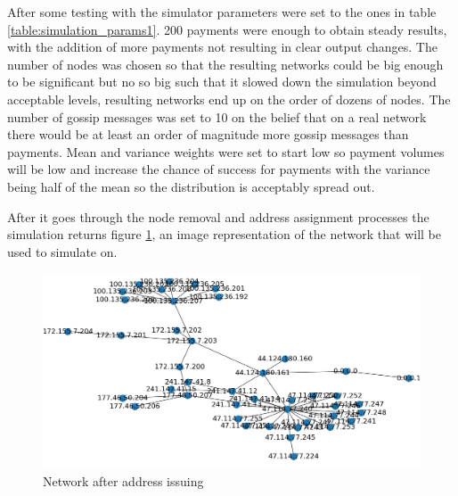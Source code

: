 After some testing with the simulator parameters were set to the ones in table \ref{table:simulation_params1}. 200 payments were enough to obtain steady results, with the addition of more payments not resulting in clear output changes. The number of nodes was chosen so that the resulting networks could be big enough to be significant but no so big such that it slowed down the simulation beyond acceptable levels, resulting networks end up
on the order of dozens of nodes. The number of gossip messages was set to 10 on the belief that on a real network there would be at least an order of magnitude more gossip messages than payments. Mean and variance weights were set to start low so payment volumes will be low and increase the chance of success for payments with the variance being half of the mean so the distribution is acceptably spread out.

\begin{table}[H]
\centering
{}
\label{table:simulation_params1}
\end{table}

After it goes through the node removal and address assignment processes the simulation returns figure \ref{fig:sim_net_addr}, an image representation of the network that will be used to simulate on.

\begin{figure}[H]
\begin{center}
  \includegraphics[width=\linewidth]{images/sim_net_addr.png}
  \caption{Network after address issuing}
  \label{fig:sim_net_addr}
  \end{center}
\end{figure}

